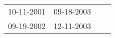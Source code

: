 \begin{supertabular}{llll}
 10-11-2001 &  09-18-2003 \\
 09-19-2002 &  12-11-2003 \\
\end{supertabular}
